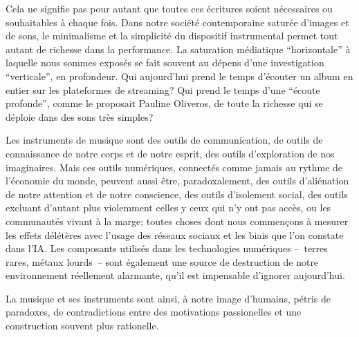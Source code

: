 Cela ne signifie pas pour autant que toutes ces écritures soient nécessaires ou souhaitables à chaque fois. Dans notre société contemporaine saturée d'images et de sons, le minimalisme et la simplicité du dispositif instrumental permet tout autant de richesse dans la performance. La saturation médiatique ``horizontale'' à laquelle nous sommes exposés se fait souvent au dépens d'une investigation ``verticale'', en profondeur. 
Qui aujourd'hui prend le temps d'écouter un album en entier sur les plateformes de streaming? Qui prend le temps d'une ``écoute profonde'', comme le proposait Pauline Oliveros, de toute la richesse qui se déploie dans des sons très simples?

Les instruments de musique sont des outils de communication, de outils de connaissance de notre corps et de notre esprit, des outils d'exploration de nos imaginaires. Mais ces outils numériques, connectés comme jamais au rythme de l'économie du monde, peuvent aussi être, paradoxalement, des outils d'aliénation de notre attention et de notre conscience, des outils d'isolement social, des outils excluant d'autant plus violemment celles y ceux qui n'y ont pas accès, ou les communautés vivant à la marge; toutes choses dont nous commençons à mesurer les effets délétères avec l'usage des réseaux sociaux et les biais que l'on constate dans l'IA. Les composants utilisés dans les technologies numériques --~terres rares, métaux lourds~-- sont également une source de destruction de notre environnement réellement alarmante, qu'il est impensable d'ignorer aujourd'hui.



La musique et ses instruments sont ainsi, à notre image d'humains, pétris de paradoxes, de contradictions entre des motivations passionelles et une construction souvent plus rationelle.


